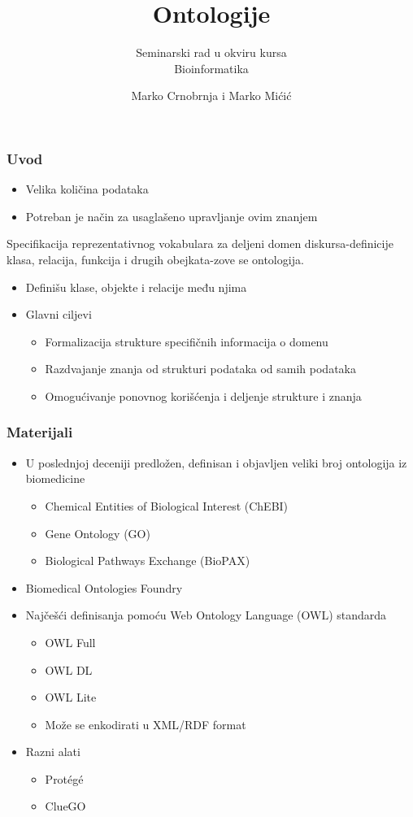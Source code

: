 \documentclass[xetex,mathserif,serif]{beamer}
\title {Ontologije}
\subtitle{Seminarski rad u okviru kursa\\Bioinformatika}
\author[Crnobrnja, Mićić] %
{Marko Crnobrnja i Marko Mićić}
\institute%
{
  Matematički fakultet\\
  Univerzitet u beogradu
}
\date %
\begin{document}
  \frame{\titlepage}
  
  \begin{frame}
    \frametitle{Uvod}
		\begin{center}		
		\begin{itemize}
			\item Velika količina podataka
			\item Potreban je način za usaglašeno upravljanje ovim znanjem
		\end{itemize}
			\begin{displayquote}
				Specifikacija reprezentativnog vokabulara za deljeni domen diskursa-definicije klasa, relacija, funkcija i drugih obejkata-zove se ontologija.
			\end{displayquote}			
		\begin{itemize}
			\item Definišu klase, objekte i relacije među njima
			\item Glavni ciljevi
				\begin{itemize}
			 		\item Formalizacija strukture specifičnih informacija o domenu
			 		\item Razdvajanje znanja od strukturi podataka od samih podataka
			 		\item Omogućivanje ponovnog korišćenja i deljenje strukture i znanja
			 	\end{itemize}
		\end{itemize}
	\end{center}
  \end{frame}  
  \begin{frame}
    \frametitle{Materijali}
		\begin{center}		
		\begin{itemize}
			\item U poslednjoj deceniji predložen, definisan i objavljen veliki broj ontologija iz biomedicine
				\begin{itemize}
					\item Chemical Entities of Biological Interest (ChEBI)
					\item Gene Ontology (GO)
					\item Biological Pathways Exchange (BioPAX)
				\end{itemize}
			\item Biomedical Ontologies Foundry
			\item Najčešći definisanja pomoću Web Ontology Language (OWL) standarda
				\begin{itemize}
					\item OWL Full
					\item OWL DL
					\item OWL Lite
					\item Može se enkodirati u XML/RDF format
				\end{itemize}
			\item Razni alati
				\begin{itemize}
					\item Protégé
					\item ClueGO
				\end{itemize}
		\end{itemize}
	\end{center}
  \end{frame}  
\end{document}
